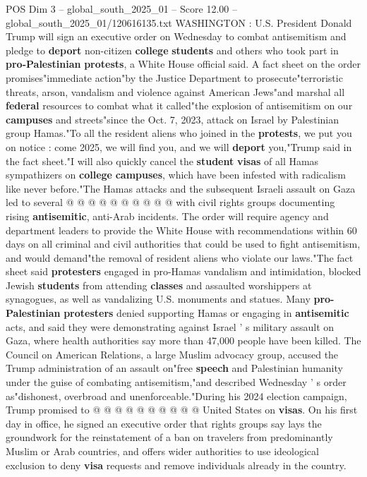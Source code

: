 \begin{textsample}{POS Dim 3 – global\_south\_2025\_01 – Score 12.00 – global\_south\_2025\_01/120616135.txt}  \label{ex:f3_pos_401}
WASHINGTON : U.S.
President Donald Trump will sign an executive order on Wednesday to combat antisemitism and pledge to \textbf{deport} non-citizen \textbf{college} \textbf{students} and others who took part in \textbf{pro-Palestinian} \textbf{protests}, a White House official said.
A fact sheet on the order promises"immediate action"by the Justice Department to prosecute"terroristic threats, arson, vandalism and violence against American Jews"and marshal all \textbf{federal} resources to combat what it called"the explosion of antisemitism on our \textbf{campuses} and streets"since the Oct. 7, 2023, attack on Israel by Palestinian group Hamas."To all the resident aliens who joined in the \textbf{protests}, we put you on notice : come 2025, we will find you, and we will \textbf{deport} you,"Trump said in the fact sheet."I will also quickly cancel the \textbf{student} \textbf{visas} of all Hamas sympathizers on \textbf{college} \textbf{campuses}, which have been infested with radicalism like never before."The Hamas attacks and the subsequent Israeli assault on Gaza led to several @ @ @ @ @ @ @ @ @ @ with civil rights groups documenting rising \textbf{antisemitic}, anti-Arab incidents.
The order will require agency and department leaders to provide the White House with recommendations within 60 days on all criminal and civil authorities that could be used to fight antisemitism, and would demand"the removal of resident aliens who violate our laws."The fact sheet said \textbf{protesters} engaged in pro-Hamas vandalism and intimidation, blocked Jewish \textbf{students} from attending \textbf{classes} and assaulted worshippers at synagogues, as well as vandalizing U.S. monuments and statues.
Many \textbf{pro-Palestinian} \textbf{protesters} denied supporting Hamas or engaging in \textbf{antisemitic} acts, and said they were demonstrating against Israel ' s military assault on Gaza, where health authorities say more than 47,000 people have been killed.
The Council on American Relations, a large Muslim advocacy group, accused the Trump administration of an assault on"free \textbf{speech} and Palestinian humanity under the guise of combating antisemitism,"and described Wednesday ' s order as"dishonest, overbroad and unenforceable."During his 2024 election campaign, Trump promised to @ @ @ @ @ @ @ @ @ @ United States on \textbf{visas}.
On his first day in office, he signed an executive order that rights groups say lays the groundwork for the reinstatement of a ban on travelers from predominantly Muslim or Arab countries, and offers wider authorities to use ideological exclusion to deny \textbf{visa} requests and remove individuals already in the country.

\end{textsample}
